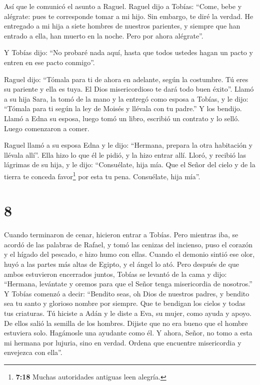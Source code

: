  Así que le comunicó el asunto a Raguel. Raguel dijo a
Tobías: ``Come, bebe y alégrate:  pues te corresponde
tomar a mi hijo. Sin embargo, te diré la verdad.  He
entregado a mi hija a siete hombres de nuestros parientes, y siempre que
han entrado a ella, han muerto en la noche. Pero por ahora alégrate''.

Y Tobías dijo: ``No probaré nada aquí, hasta que todos ustedes hagan un
pacto y entren en ese pacto conmigo''.

 Raguel dijo: ``Tómala para ti de ahora en adelante,
según la costumbre. Tú eres su pariente y ella es tuya. El Dios
misericordioso te dará todo buen éxito''.  Llamó a su
hija Sara, la tomó de la mano y la entregó como esposa a Tobías, y le
dijo: ``Tómala para ti según la ley de Moisés y llévala con tu padre.''
Y los bendijo.  Llamó a Edna su esposa, luego tomó un
libro, escribió un contrato y lo selló.  Luego comenzaron
a comer.

 Raguel llamó a su esposa Edna y le dijo: ``Hermana,
prepara la otra habitación y llévala allí''.  Ella hizo
lo que él le pidió, y la hizo entrar allí. Lloró, y recibió las lágrimas
de su hija, y le dijo:  ``Consuélate, hija mía. Que el
Señor del cielo y de la tierra te conceda favor\footnote{\textbf{7:18}
  Muchas autoridades antiguas leen alegría.} por esta tu pena.
Consuélate, hija mía''.

\hypertarget{section-7}{%
\section{8}\label{section-7}}

 Cuando terminaron de cenar, hicieron entrar a Tobías.
 Pero mientras iba, se acordó de las palabras de Rafael, y
tomó las cenizas del incienso, puso el corazón y el hígado del pescado,
e hizo humo con ellas.  Cuando el demonio sintió ese olor,
huyó a las partes más altas de Egipto, y el ángel lo ató. 
Pero después de que ambos estuvieron encerrados juntos, Tobías se
levantó de la cama y dijo: ``Hermana, levántate y oremos para que el
Señor tenga misericordia de nosotros.''  Y Tobías comenzó
a decir: ``Bendito seas, oh Dios de nuestros padres, y bendito sea tu
santo y glorioso nombre por siempre. Que te bendigan los cielos y todas
tus criaturas.  Tú hiciste a Adán y le diste a Eva, su
mujer, como ayuda y apoyo. De ellos salió la semilla de los hombres.
Dijiste que no era bueno que el hombre estuviera solo. Hagámosle una
ayudante como él.  Y ahora, Señor, no tomo a esta mi
hermana por lujuria, sino en verdad. Ordena que encuentre misericordia y
envejezca con ella''.

